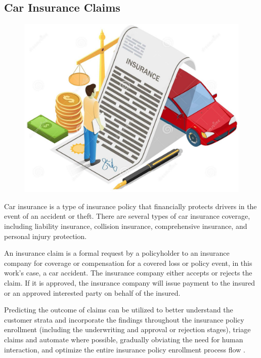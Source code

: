 \documentclass{article}
\begin{document}
\hypertarget{car-insurance-claims}{%
\subsection{\texorpdfstring{Car Insurance Claims
\label{subsec:claim}}{Car Insurance Claims }}\label{car-insurance-claims}}

\begin{figure}
\includegraphics[width=0.9\linewidth]{./figures/carinsurance.png}
\end{figure}

Car insurance is a type of insurance policy that financially protects
drivers in the event of an accident or theft. There are several types of
car insurance coverage, including liability insurance, collision
insurance, comprehensive insurance, and personal injury protection.

An insurance claim is a formal request by a policyholder to an insurance
company for coverage or compensation for a covered loss or policy event,
in this work's case, a car accident. The insurance company either
accepts or rejects the claim. If it is approved, the insurance company
will issue payment to the insured or an approved interested party on
behalf of the insured.

Predicting the outcome of claims can be utilized to better understand
the customer strata and incorporate the findings throughout the
insurance policy enrollment (including the underwriting and approval or
rejection stages), triage claims and automate where possible, gradually
obviating the need for human interaction, and optimize the entire
insurance policy enrollment process flow \cite{claim}.
\end{document}
